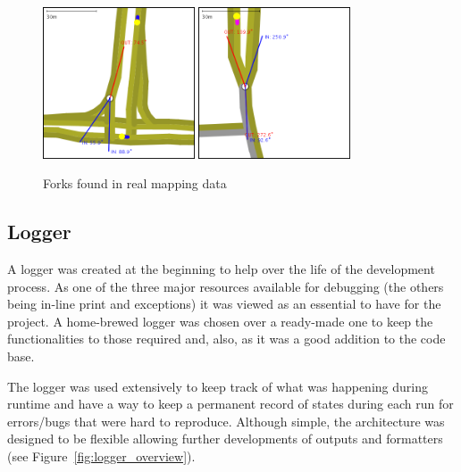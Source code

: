 \begin{figure}[h]
    \vspace{1.5em}
    \caption{Forks found in real mapping data}
    \label{fig:forkTypes}
    \centering
    \includegraphics[width=0.4\textwidth]{figs/junction/junction_oneway_to_fork.png}
    \hspace{0.2em}
    \includegraphics[width=0.4\textwidth]{figs/junction/junction_two_way_to_fork.png}
    \vspace{1.5em}
\end{figure}

\subsection{Logger}

A logger was created at the beginning to help over the life of the development process. As one of the three major resources available for debugging (the others being in-line print and exceptions) it was viewed as an essential to have for the project. A home-brewed logger was chosen over a ready-made one to keep the functionalities to those required and, also, as it was a good addition to the code base.

The logger was used extensively to keep track of what was happening during runtime and have a way to keep a permanent record of states during each run for errors/bugs that were hard to reproduce. Although simple, the architecture was designed to be flexible allowing further developments of outputs and formatters (see Figure~\ref{fig:logger_overview}).

